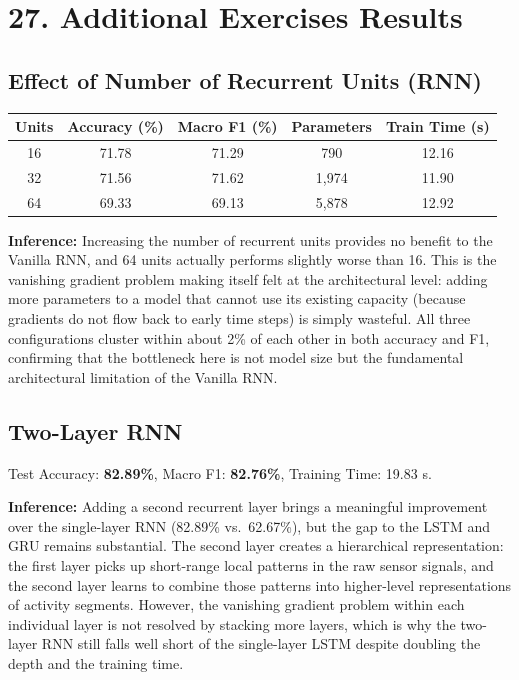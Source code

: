 \documentclass[10pt]{article}
\begin{document}
\section*{27. Additional Exercises Results}

\subsection*{Effect of Number of Recurrent Units (RNN)}

\begin{center}
\begin{tabular}{|c|c|c|c|c|}
\hline
Units & Accuracy (\%) & Macro F1 (\%) & Parameters & Train Time (s)\\
\hline
16 & 71.78 & 71.29 & 790 & 12.16\\
32 & 71.56 & 71.62 & 1{,}974 & 11.90\\
64 & 69.33 & 69.13 & 5{,}878 & 12.92\\
\hline
\end{tabular}
\end{center}

\textbf{Inference:}
Increasing the number of recurrent units provides no benefit to the Vanilla
RNN, and 64 units actually performs slightly worse than 16. This is the
vanishing gradient problem making itself felt at the architectural level:
adding more parameters to a model that cannot use its existing capacity
(because gradients do not flow back to early time steps) is simply wasteful.
All three configurations cluster within about 2\% of each other in both
accuracy and F1, confirming that the bottleneck here is not model size but
the fundamental architectural limitation of the Vanilla RNN.

\subsection*{Two-Layer RNN}

Test Accuracy: \textbf{82.89\%}, Macro F1: \textbf{82.76\%}, Training Time: 19.83 s.

\textbf{Inference:}
Adding a second recurrent layer brings a meaningful improvement over the
single-layer RNN (82.89\% vs.\ 62.67\%), but the gap to the LSTM and GRU
remains substantial. The second layer creates a hierarchical representation:
the first layer picks up short-range local patterns in the raw sensor signals,
and the second layer learns to combine those patterns into higher-level
representations of activity segments. However, the vanishing gradient problem
within each individual layer is not resolved by stacking more layers, which
is why the two-layer RNN still falls well short of the single-layer LSTM
despite doubling the depth and the training time.
\end{document}
